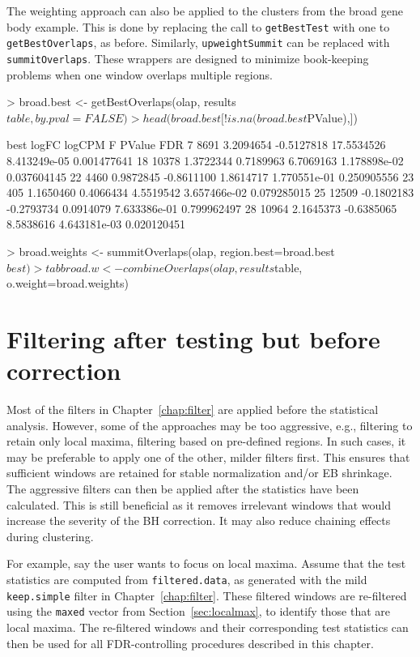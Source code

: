 \documentclass[12pt]{report}
\renewenvironment{Schunk}{\vspace{0pt}}{\vspace{0pt}}
\newcommand{\code}[1]{{\small\texttt{#1}}}
\begin{document}
The weighting approach can also be applied to the clusters from the broad gene body example.
This is done by replacing the call to \code{getBestTest} with one to \code{getBestOverlaps}, as before.
Similarly, \code{upweightSummit} can be replaced with \code{summitOverlaps}.
These wrappers are designed to minimize book-keeping problems when one window overlaps multiple regions.

\begin{Schunk}
\begin{Sinput}
> broad.best <- getBestOverlaps(olap, results$table, by.pval=FALSE)
> head(broad.best[!is.na(broad.best$PValue),])
\end{Sinput}
\begin{Soutput}
    best      logFC     logCPM          F       PValue         FDR
7   8691  3.2094654 -0.5127818 17.5534526 8.413249e-05 0.001477641
18 10378  1.3722344  0.7189963  6.7069163 1.178898e-02 0.037604145
22  4460  0.9872845 -0.8611100  1.8614717 1.770551e-01 0.250905556
23   405  1.1650460  0.4066434  4.5519542 3.657466e-02 0.079285015
25 12509 -0.1802183 -0.2793734  0.0914079 7.633386e-01 0.799962497
28 10964  2.1645373 -0.6385065  8.5838616 4.643181e-03 0.020120451
\end{Soutput}
\begin{Sinput}
> broad.weights <- summitOverlaps(olap, region.best=broad.best$best)
> tabbroad.w <- combineOverlaps(olap, results$table, o.weight=broad.weights) 
\end{Sinput}
\end{Schunk}

\section{Filtering after testing but before correction}
Most of the filters in Chapter~\ref{chap:filter} are applied before the statistical analysis.
However, some of the approaches may be too aggressive, e.g., filtering to retain only local maxima, filtering based on pre-defined regions.
In such cases, it may be preferable to apply one of the other, milder filters first.
This ensures that sufficient windows are retained for stable normalization and/or EB shrinkage.
The aggressive filters can then be applied after the statistics have been calculated.
This is still beneficial as it removes irrelevant windows that would increase the severity of the BH correction.
It may also reduce chaining effects during clustering.

For example, say the user wants to focus on local maxima.
Assume that the test statistics are computed from \code{filtered.data}, as generated with the mild \code{keep.simple} filter in Chapter~\ref{chap:filter}.
These filtered windows are re-filtered using the \code{maxed} vector from Section~\ref{sec:localmax}, to identify those that are local maxima.
The re-filtered windows and their corresponding test statistics can then be used for all FDR-controlling procedures described in this chapter.
\end{document}
